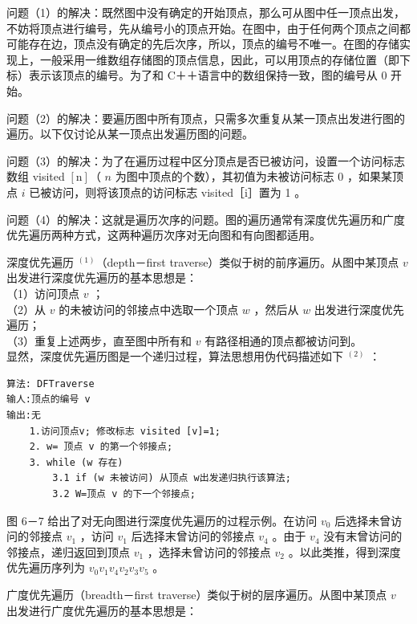 \documentclass[10pt]{article}
\begin{document}
问题（1）的解决：既然图中没有确定的开始顶点，那么可从图中任一顶点出发，不妨将顶点进行编号，先从编号小的顶点开始。在图中，由于任何两个顶点之间都可能存在边，顶点没有确定的先后次序，所以，顶点的编号不唯一。在图的存储实现上，一般采用一维数组存储图的顶点信息，因此，可以用顶点的存储位置（即下标）表示该顶点的编号。为了和 C＋＋语言中的数组保持一致，图的编号从 0 开始。

问题（2）的解决：要遍历图中所有顶点，只需多次重复从某一顶点出发进行图的遍历。以下仅讨论从某一顶点出发遍历图的问题。

问题（3）的解决：为了在遍历过程中区分顶点是否已被访问，设置一个访问标志数组 visited $[\mathrm{n}]$（ $n$ 为图中顶点的个数），其初值为未被访问标志 0 ，如果某顶点 $i$ 已被访问，则将该顶点的访问标志 visited［i］置为 1 。

问题（4）的解决：这就是遍历次序的问题。图的遍历通常有深度优先遍历和广度优先遍历两种方式，这两种遍历次序对无向图和有向图都适用。

深度优先遍历 ${ }^{(1)}$（depth－first traverse）类似于树的前序遍历。从图中某顶点 $v$ 出发进行深度优先遍历的基本思想是：\\
（1）访问顶点 $v$ ；\\
（2）从 $v$ 的未被访问的邻接点中选取一个顶点 $w$ ，然后从 $w$ 出发进行深度优先遍历；\\
（3）重复上述两步，直至图中所有和 $v$ 有路径相通的顶点都被访问到。\\
显然，深度优先遍历图是一个递归过程，算法思想用伪代码描述如下 ${ }^{(2)}$ ：

\begin{verbatim}
算法: DFTraverse
输人:顶点的编号 v
输出:无
    1.访问顶点v; 修改标志 visited [v]=1;
    2. w= 顶点 v 的第一个邻接点;
    3. while (w 存在)
        3.1 if (w 未被访问) 从顶点 w出发递归执行该算法;
        3.2 W=顶点 v 的下一个邻接点;
\end{verbatim}

图 6－7 给出了对无向图进行深度优先遍历的过程示例。在访问 $v_{0}$ 后选择未曾访问的邻接点 $v_{1}$ ，访问 $v_{1}$ 后选择末曾访问的邻接点 $v_{4}$ 。由于 $v_{4}$ 没有末曾访问的邻接点，递归返回到顶点 $v_{1}$ ，选择未曾访问的邻接点 $v_{2}$ 。以此类推，得到深度优先遍历序列为 $v_{0} v_{1} v_{4} v_{2} v_{3} v_{5}$ 。

广度优先遍历（breadth－first traverse）类似于树的层序遍历。从图中某顶点 $v$ 出发进行广度优先遍历的基本思想是：
\end{document}
